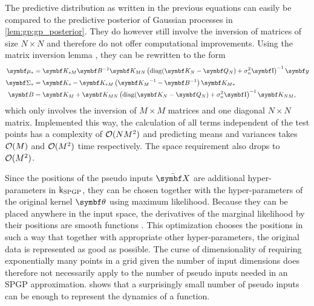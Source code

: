 The predictive distribution as written in the previous equations can easily be compared to the predictive posterior of Gaussian processes in \cref{lem:gp:gp_posterior}.
They do however still involve the inversion of matrices of size $N \times N$ and therefore do not offer computational improvements.
Using the matrix inversion lemma \cite{petersen_matrix_2008}, they can be rewritten to the form
\begin{align}
    \begin{split}
        \mat{\mu_\ast} &= \mat{K_{\ast M}} \mat{B}^{-1} \mat{K_{MN}} \left( \diag(\mat{K_N} - \mat{Q_N}) + \sigma_n^2 \Eye \right)^{-1} \mat{y} \\
        \mat{\Sigma_\ast} &= \mat{K_\ast} - \mat{K_{\ast M}} \left( \mat{K_M}^{-1} - \mat{B}^{-1} \right) \mat{K_{M \ast}}\vphantom{\left(\mat{K_M}^{-1} \right)^{-1}} \\
        \mat{B} &= \mat{K_M} + \mat{K_{MN}} \left( \diag(\mat{K_N} - \mat{Q_N}) + \sigma_n^2 \Eye \right)^{-1} \mat{K_{NM}},
    \end{split}
\end{align}
which only involves the inversion of $M \times M$ matrices and one diagonal $N \times N$ matrix.
Implemented this way, the calculation of all terms independent of the test points has a complexity of $\operatorname{\mathcal{O}}(NM^2)$ and predicting means and variances takes $\operatorname{\mathcal{O}}(M)$ and $\operatorname{\mathcal{O}}(M^2)$ time respectively.
The space requirement also drops to $\operatorname{\mathcal{O}}(M^2)$.

Since the positions of the pseudo inputs $\ps{\mat{X}}$ are additional hyper-parameters in $\operatorname{k}_{\text{SPGP}}$, they can be chosen together with the hyper-parameters of the original kernel $\mat{\theta}$ using maximum likelihood.
Because they can be placed anywhere in the input space, the derivatives of the marginal likelihood by their positions are smooth functions \cite{snelson_sparse_2005}.
This optimization chooses the positions in such a way that together with appropriate other hyper-parameters, the original data is represented as good as possible.
The curse of dimensionality of requiring exponentially many points in a grid given the number of input dimensions does therefore not necessarily apply to the number of pseudo inputs needed in an SPGP approximation.
 shows that a surprisingly small number of pseudo inputs can be enough to represent the dynamics of a function.

